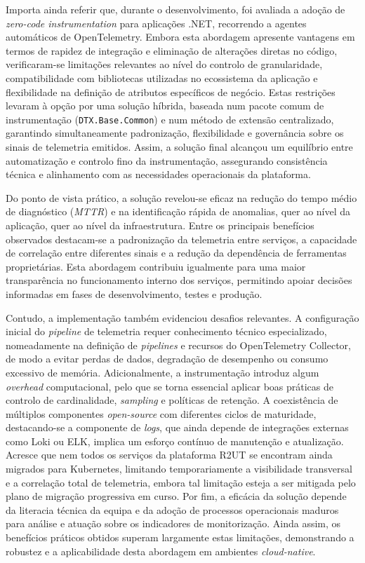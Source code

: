 Importa ainda referir que, durante o desenvolvimento, foi avaliada a adoção de \textit{zero-code instrumentation} para aplicações .NET, recorrendo a agentes automáticos de OpenTelemetry. Embora esta abordagem apresente vantagens em termos de rapidez de integração e eliminação de alterações diretas no código, verificaram-se limitações relevantes ao nível do controlo de granularidade, compatibilidade com bibliotecas utilizadas no ecossistema da aplicação e flexibilidade na definição de atributos específicos de negócio. Estas restrições levaram à opção por uma solução híbrida, baseada num pacote comum de instrumentação (\texttt{DTX.Base.Common}) e num método de extensão centralizado, garantindo simultaneamente padronização, flexibilidade e governância sobre os sinais de telemetria emitidos. Assim, a solução final alcançou um equilíbrio entre automatização e controlo fino da instrumentação, assegurando consistência técnica e alinhamento com as necessidades operacionais da plataforma.


Do ponto de vista prático, a solução revelou-se eficaz na redução do tempo médio de diagnóstico (\textit{MTTR}) e na identificação rápida de anomalias, quer ao nível da aplicação, quer ao nível da infraestrutura. Entre os principais benefícios observados destacam-se a padronização da telemetria entre serviços, a capacidade de correlação entre diferentes sinais e a redução da dependência de ferramentas proprietárias. Esta abordagem contribuiu igualmente para uma maior transparência no funcionamento interno dos serviços, permitindo apoiar decisões informadas em fases de desenvolvimento, testes e produção.

Contudo, a implementação também evidenciou desafios relevantes. A configuração inicial do \textit{pipeline} de telemetria requer conhecimento técnico especializado, nomeadamente na definição de \textit{pipelines} e recursos do OpenTelemetry Collector, de modo a evitar perdas de dados, degradação de desempenho ou consumo excessivo de memória. Adicionalmente, a instrumentação introduz algum \textit{overhead} computacional, pelo que se torna essencial aplicar boas práticas de controlo de cardinalidade, \textit{sampling} e políticas de retenção. A coexistência de múltiplos componentes \textit{open-source} com diferentes ciclos de maturidade, destacando-se a componente de \textit{logs}, que ainda depende de integrações externas como Loki ou ELK, implica um esforço contínuo de manutenção e atualização. Acresce que nem todos os serviços da plataforma R2UT se encontram ainda migrados para Kubernetes, limitando temporariamente a visibilidade transversal e a correlação total de telemetria, embora tal limitação esteja a ser mitigada pelo plano de migração progressiva em curso. Por fim, a eficácia da solução depende da literacia técnica da equipa e da adoção de processos operacionais maduros para análise e atuação sobre os indicadores de monitorização. Ainda assim, os benefícios práticos obtidos superam largamente estas limitações, demonstrando a robustez e a aplicabilidade desta abordagem em ambientes \textit{cloud-native}.

